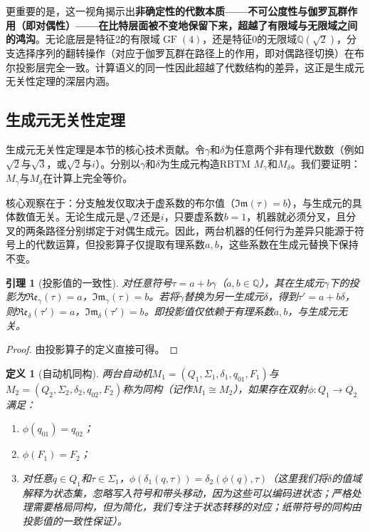 \documentclass{ctexart}
\newtheorem{lemma}[theorem]{引理}
\newtheorem{definition}[theorem]{定义}
\newtheorem{proof}[theorem]{证明}
\begin{document}
	更重要的是，这一视角揭示出\textbf{非确定性的代数本质——不可公度性与伽罗瓦群作用（即对偶性）——在比特层面被不变地保留下来，超越了有限域与无限域之间的鸿沟}。无论底层是特征2的有限域$\operatorname{GF}(4)$，还是特征0的无限域$\mathbb{Q}(\sqrt{2})$，分支选择序列的翻转操作（对应于伽罗瓦群在路径上的作用，即对偶路径切换）在布尔投影层完全一致。计算语义的同一性因此超越了代数结构的差异，这正是生成元无关性定理的深层内涵。
	
	\subsection{生成元无关性定理}
	
	生成元无关性定理是本节的核心技术贡献。令$\gamma$和$\delta$为任意两个非有理代数数（例如$\sqrt{2}$与$\sqrt{3}$，或$\sqrt{2}$与$i$）。分别以$\gamma$和$\delta$为生成元构造RBTM $M_\gamma$和$M_\delta$。我们要证明：$M_\gamma$与$M_\delta$在计算上完全等价。
	
	核心观察在于：分支触发仅取决于虚系数的布尔值（$\mathfrak{Im}(\tau)=b$），与生成元的具体数值无关。无论生成元是$\sqrt{2}$还是$i$，只要虚系数$b=1$，机器就必须分叉，且分叉的两条路径分别绑定于对偶生成元。因此，两台机器的任何行为差异只能源于符号上的代数运算，但投影算子仅提取有理系数$a,b$，这些系数在生成元替换下保持不变。
	
	\begin{lemma}[投影值的一致性]\label{lem:proj-consistency}
		对任意符号$\tau=a+b\gamma$（$a,b\in\mathbb{Q}$），其在生成元$\gamma$下的投影为$\mathfrak{Re}_\gamma(\tau)=a$，$\mathfrak{Im}_\gamma(\tau)=b$。若将$\gamma$替换为另一生成元$\delta$，得到$\tau'=a+b\delta$，则$\mathfrak{Re}_\delta(\tau')=a$，$\mathfrak{Im}_\delta(\tau')=b$。即投影值仅依赖于有理系数$a,b$，与生成元无关。
	\end{lemma}
	\begin{proof}
		由投影算子的定义直接可得。
	\end{proof}
	
	\begin{definition}[自动机同构]\label{def:automaton-isomorphism}
		两台自动机$M_1=(Q_1,\Sigma_1,\delta_1,q_{01},F_1)$与$M_2=(Q_2,\Sigma_2,\delta_2,q_{02},F_2)$称为同构（记作$M_1\cong M_2$），如果存在双射$\phi:Q_1\to Q_2$满足：
		\begin{enumerate}
			\item $\phi(q_{01})=q_{02}$；
			\item $\phi(F_1)=F_2$；
			\item 对任意$q\in Q_1$和$\tau\in\Sigma_1$，$\phi(\delta_1(q,\tau))=\delta_2(\phi(q),\tau)$（这里我们将$\delta$的值域解释为状态集，忽略写入符号和带头移动，因为这些可以编码进状态；严格处理需要格局同构，但为简化，我们专注于状态转移的对应；纸带符号的同构由投影值的一致性保证）。
		\end{enumerate}
	\end{definition}
	
\end{document}
